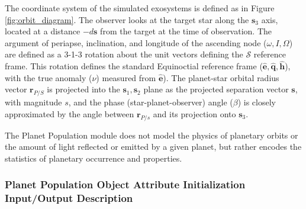 \documentclass[cleanfoot]{asme2ej}
\def\mf{\mathbf}
\newcommand{\mfhat}[1]{\mf{\hat{#1}}}
\newcommand{\reffig}[1]{Figure \ref{#1}}
\begin{document}
The coordinate system of the simulated exosystems is defined as in \reffig{fig:orbit_diagram}.  The observer looks at the target star along the $\mathbf{s}_3$ axis, located at a distance $-d\mathbf{s}$ from the target at the time of observation. The argument of periapse, inclination,  and longitude of the ascending node ($\omega, I, \Omega$) are defined as a 3-1-3 rotation about the unit vectors defining the $\mathcal{S}$ reference frame.  This rotation defines the standard Equinoctial reference frame ($\mfhat{e}, \mfhat{q}, \mfhat{h}$), with the true anomaly ($\nu$) measured from $\mfhat{e}$).  The planet-star orbital radius vector $\mf r_{P/S}$ is projected into the $\mf s_1, \mf s_2$ plane as the projected separation vector $\mf s$, with magnitude $s$, and the phase (star-planet-observer) angle ($\beta$) is closely approximated by the angle between $\mf r_{P/s}$ and its projection onto $\mf s_3$.

The Planet Population module does not model the physics of planetary orbits or the amount of light reflected or emitted by a given planet, but rather encodes the statistics of planetary occurrence and properties. 

\label{sec:planetpopulation}
\subsubsection{Planet Population Object Attribute Initialization Input/Output Description} 
\end{document}
